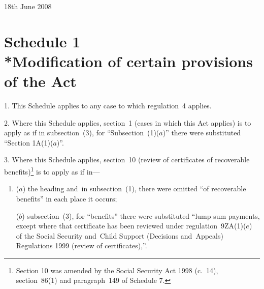\documentclass[12pt,a4paper]{article}
\begin{document}
18th June 2008


\small

\part[Schedule 1 --- Modification of certain provisions of the Act]{Schedule 1\\*Modification of certain provisions of the Act}

\renewcommand\parthead{--- Schedule 1}

1.  This Schedule applies to any case to which regulation~4 applies.

\medskip

2.  Where this Schedule applies, section~1 (cases in which this Act applies) is to apply as if in subsection~(3), for “Subsection~(1)($a$)” there were substituted “Section 1A(1)($a$)”.

\medskip

3.  Where this Schedule applies, section~10 (review of certificates of recoverable benefits)\footnote{Section 10 was amended by the Social Security Act 1998 (c.~14), section~86(1) and paragraph~149 of Schedule 7.} is to apply as if in—
\begin{enumerate}\item[]
($a$) the heading and~in subsection~(1), there were omitted “of recoverable benefits” in each place it occurs;

($b$) subsection~(3), for “benefits” there were substituted “lump sum payments, except where that certificate has been reviewed under regulation~9ZA(1)($e$)  of the Social Security and~Child Support (Decisions and~Appeals) Regulations 1999 (review of certificates),”.
\end{enumerate}

\medskip
\end{document}
